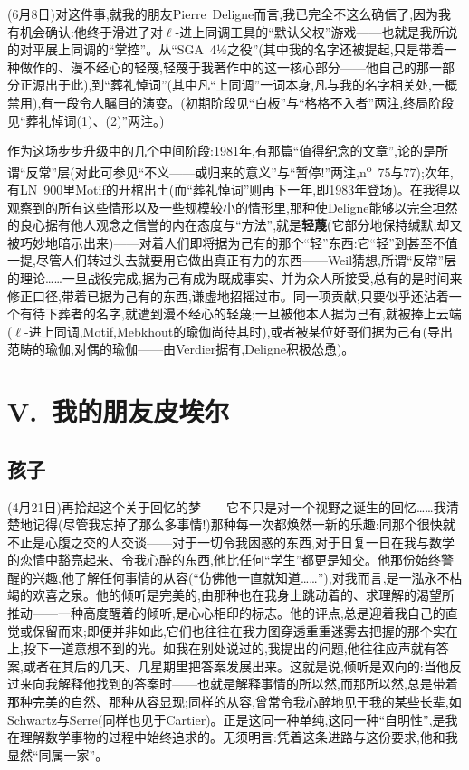 (6月8日)对这件事,就我的朋友Pierre~Deligne而言,我已完全不这么确信了,因为我有机会确认:他终于滑进了对$\ell$-进上同调工具的“默认父权”游戏——也就是我所说的对平展上同调的“掌控”。从“SGA~4½之役”(其中我的名字还被提起,只是带着一种做作的、漫不经心的轻蔑,轻蔑于我著作中的这一核心部分——他自己的那一部分正源出于此),到“葬礼悼词”(其中凡“上同调”一词本身,凡与我的名字相关处,一概禁用),有一段令人瞩目的演变。(初期阶段见“白板”与“格格不入者”两注,终局阶段见“葬礼悼词(1)、(2)”两注。)

作为这场步步升级中的几个中间阶段:1981年,有那篇“值得纪念的文章”,论的是所谓“反常”层(对此可参见“不义——或归来的意义”与“暂停!”两注,n\textsuperscript{o}~75与77);次年,有LN~900里Motif的开棺出土(而“葬礼悼词”则再下一年,即1983年登场)。在我得以观察到的所有这些情形以及一些规模较小的情形里,那种使Deligne能够以完全坦然的良心据有他人观念之信誉的内在态度与“方法”,就是\textbf{轻蔑}(它部分地保持缄默,却又被巧妙地暗示出来)——对着人们即将据为己有的那个“轻”东西:它“轻”到甚至不值一提,尽管人们转过头去就要用它做出真正有力的东西——Weil猜想,所谓“反常”层的理论……一旦战役完成,据为己有成为既成事实、并为众人所接受,总有的是时间来修正口径,带着已据为己有的东西,谦虚地招摇过市。同一项贡献,只要似乎还沾着一个有待下葬者的名字,就遭到漫不经心的轻蔑;\dmark{}一旦被他本人据为己有,就被捧上云端($\ell$-进上同调,Motif,Mebkhout的瑜伽尚待其时),或者被某位好哥们据为己有(导出范畴的瑜伽,对偶的瑜伽——由Verdier据有,Deligne积极怂恿)。

\section{V.~我的朋友皮埃尔}

\subsection{孩子}


\dmark{}(4月21日)再拾起这个关于回忆的梦——它不只是对一个视野之诞生的回忆……我清楚地记得(尽管我忘掉了那么多事情!)那种每一次都焕然一新的乐趣:同那个很快就不止是心腹之交的人交谈——对于一切令我困惑的东西,对于日复一日在我与数学的恋情中豁亮起来、令我心醉的东西,他比任何“学生”都更是知交。他那份始终警醒的兴趣,他了解任何事情的从容(“仿佛他一直就知道……”),对我而言,是一泓永不枯竭的欢喜之泉。他的倾听是完美的,由那种也在我身上跳动着的、求理解的渴望所推动——一种高度醒着的倾听,是心心相印的标志。他的评点,总是迎着我自己的直觉或保留而来;即便并非如此,它们也往往在我力图穿透重重迷雾去把握的那个实在上,投下一道意想不到的光。如我在别处说过的,我提出的问题,他往往应声就有答案,或者在其后的几天、几星期里把答案发展出来。这就是说,倾听是双向的:当他反过来向我解释他找到的答案时——也就是解释事情的所以然,而那所以然,总是带着那种完美的自然、那种从容显现;同样的从容,曾常令我心醉地见于我的某些长辈,如Schwartz与Serre(同样也见于Cartier)。正是这同一种单纯,这同一种“自明性”,是我在理解数学事物的过程中始终追求的。无须明言:凭着这条进路与这份要求,他和我显然“同属一家”。

